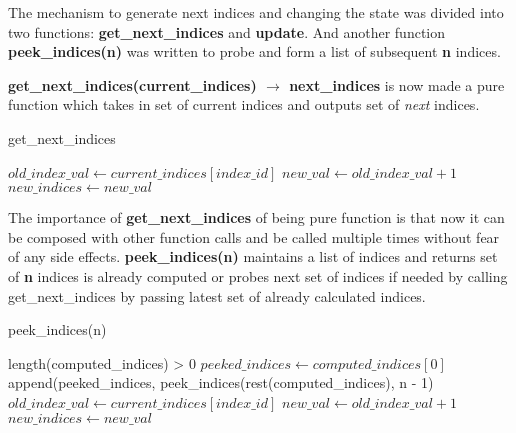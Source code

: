 The mechanism to generate next indices and changing the state was
divided into two functions: \textbf{get\_next\_indices} and \textbf{update}. And
another function \textbf{peek\_indices(n)} was written to probe and form a list
of subsequent \textbf{n} indices.

\textbf{get\_next\_indices(current\_indices) $\rightarrow$ next\_indices} is now
made a pure function which takes in set of current indices and outputs set of
\textit{next} indices.

\begin{algorithm}  {get\_next\_indices}
\singlespacing

\begin{algorithmic}[1]
\State $old\_index\_val \gets current\_indices[index\_id]$
\State $new\_val \gets old\_index\_val + 1$
\State $new\_indices \gets new\_val$
\EndFor%
\State {}
\EndFunction
\end{algorithmic}
\end{algorithm}

The importance of \textbf{get\_next\_indices} of being pure function is that now
it can be composed with other function calls and be called multiple times without
fear of any side effects. \textbf{peek\_indices(n)} maintains a list of indices
and returns set of \textbf{n} indices is already computed or probes next set of
indices if needed by calling get\_next\_indices by passing latest set of
already calculated indices.

\begin{algorithm}  {peek\_indices(n)}
\singlespacing

\begin{algorithmic}[1]
\If length(computed\_indices) > 0
  \State $peeked\_indices \gets computed\_indices[0]$
  \State \Return append(peeked\_indices, peek\_indices(rest(computed\_indices), n
  - 1)
\EndIf
\State $old\_index\_val \gets current\_indices[index\_id]$
\State $new\_val \gets old\_index\_val + 1$
\State $new\_indices \gets new\_val$
\State {}
\EndFunction
\end{algorithmic}
\end{algorithm}